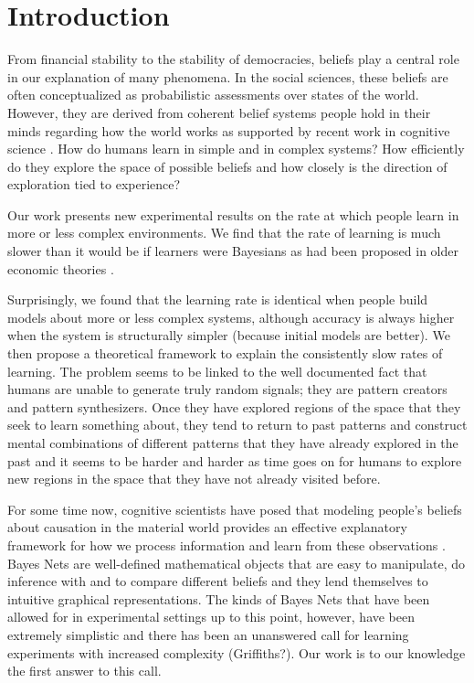 \section{Introduction}
From financial stability to the stability of democracies, beliefs play a central role in our explanation of many phenomena. In the social sciences, these beliefs are often conceptualized as probabilistic assessments over states of the world.  However, they are derived from coherent belief systems people hold in their minds regarding how the world works as supported by recent work in cognitive science \cite{lombrozo2006structure, anderson1990cognitive}.  How do humans learn in simple and in complex systems?  How efficiently do they explore the space of possible beliefs and how closely is the direction of exploration tied to experience?  

Our work presents new experimental results on the rate at which people learn in more or less complex environments. We find that the rate of learning is much slower than it would be if learners were Bayesians as had been proposed in older economic theories \cite{Boyer84, Prescott72, Rothschild74, McLennan84, Mirman84, Easley89, Kiefer89}.

 Surprisingly, we found that the learning rate is identical when people build models about more or less complex systems, although accuracy is always higher when the system is structurally simpler (because initial models are better). We then propose a theoretical framework to explain the consistently slow rates of learning.  The problem seems to be linked to the well documented fact that humans are unable to generate truly random signals; they are pattern creators and pattern synthesizers.  Once they have explored regions of the space that they seek to learn something about, they tend to return to past patterns and construct mental combinations of different patterns that they have already explored in the past and it seems to be harder and harder as time goes on for humans to explore new regions in the space that they have not already visited before.

For some time now, cognitive scientists have posed that modeling people's beliefs about causation in the material world provides an effective explanatory framework for how we process information and learn from these observations \cite{Griffiths2008}.  Bayes Nets are well-defined mathematical objects that are easy to manipulate, do inference with and to compare different beliefs and they lend themselves to intuitive graphical representations.  The kinds of Bayes Nets that have been allowed for in experimental settings up to this point, however, have been extremely simplistic and there has been an unanswered call for learning experiments with increased complexity (Griffiths?).  Our work is to our knowledge the first answer to this call.  

